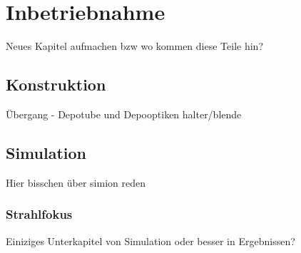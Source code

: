 \chapter{Inbetriebnahme}
Neues Kapitel aufmachen bzw wo kommen diese Teile hin?
\section{Konstruktion}
Übergang - Depotube und Depooptiken halter/blende
\section{Simulation}
Hier bisschen über simion reden
\subsection{Strahlfokus}
Einiziges Unterkapitel von Simulation oder besser in Ergebnissen?
